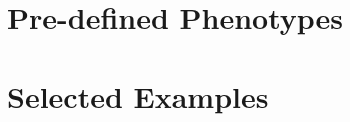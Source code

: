 

\newpage
\section{Pre-defined Phenotypes}\label{sec:predef}


\section{Selected Examples}\label{sec:examples}


